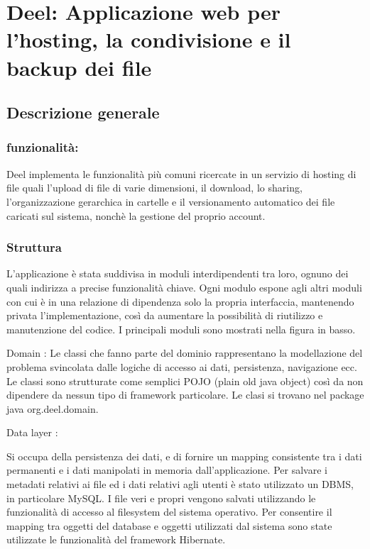 \chapter{Deel: Applicazione web per l'hosting, la condivisione e il backup dei file}

\section{Descrizione generale}

\subsection{funzionalità:}

Deel implementa le funzionalità più comuni ricercate in un servizio di
hosting di file quali l'upload di file di varie dimensioni, il
download, lo sharing, l'organizzazione gerarchica in cartelle e il
versionamento automatico dei file caricati sul sistema, nonchè la gestione del
proprio account.

\subsection{Struttura}



L'applicazione è stata suddivisa in moduli interdipendenti tra loro,
ognuno dei quali indirizza a precise funzionalità chiave. Ogni modulo
espone agli altri moduli con cui è in una relazione di dipendenza solo
la propria interfaccia, mantenendo privata l'implementazione, così da aumentare
la possibilità di riutilizzo e manutenzione del codice. 
I principali moduli sono mostrati nella figura in basso. 


Domain : 
Le classi che fanno parte del dominio rappresentano la  modellazione del
problema svincolata dalle logiche di accesso ai dati, persistenza,
navigazione ecc. Le classi sono strutturate come semplici POJO (plain
old java object) così da non dipendere da nessun tipo di framework
particolare. Le clasi si trovano nel package java org.deel.domain.

Data layer : 

Si occupa della persistenza dei dati, e di fornire un mapping
consistente tra i dati permanenti e i dati manipolati in memoria
dall'applicazione. Per salvare i metadati relativi ai file ed i dati
relativi agli utenti è stato utilizzato un DBMS, in particolare
MySQL. I file veri e propri vengono salvati utilizzando le
funzionalità di accesso al filesystem del sistema operativo. Per
consentire il mapping tra oggetti del database e oggetti utilizzati
dal sistema sono state utilizzate le funzionalità del framework
Hibernate.

